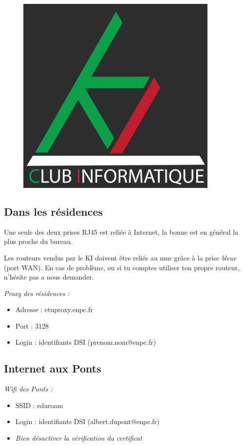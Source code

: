 \documentclass{../templates/enpc-ki/ki019}
\begin{document}
    \begin{figure}[H]
      \centering
      \includegraphics[width=10cm]{page2}
    \end{figure}

    \vspace{2cm}
    \begin{kiframe}
      \subsection{Dans les résidences} %
        Une seule des deux prises RJ45 est reliée à Internet, la bonne est en général la plus proche du bureau.

        Les routeurs vendus par le KI doivent être reliés au mur grâce à la prise \emph{bleue} (port WAN). En cas de problème, ou si tu comptes utiliser ton propre routeur, n'hésite pas a nous demander.

        \begin{flushleft}
          \emph{Proxy des résidences :}
          \begin{itemize}
            \item Adresse : etuproxy.enpc.fr
            \item Port : 3128
            \item Login : identifiants DSI (prenom.nom@enpc.fr)
          \end{itemize}
        \end{flushleft}

      \subsection{Internet aux Ponts}
        \begin{flushleft}
          \emph{Wifi des Ponts :}
          \begin{itemize}
            \item SSID : eduroam
            \item Login : identifiants DSI (albert.dupont@enpc.fr)
            \item \emph{Bien désactiver la vérification du certificat}
          \end{itemize}
        \end{flushleft}
      \end{kiframe}
\end{document}
